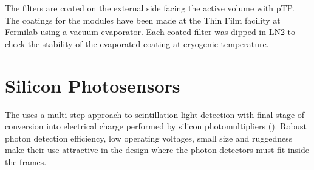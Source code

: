 The filters are coated on the external side facing the \lar active volume with pTP.  The coatings for the  modules have been made at the Thin Film facility at Fermilab using a vacuum evaporator. Each coated filter was dipped in LN2 to check the stability of the evaporated coating at cryogenic temperature. 




%




\section{Silicon Photosensors}
\label{sec:fdsp-pd-ps}

The   uses a multi-step approach to scintillation light detection with final stage of conversion into electrical charge performed by silicon photomultipliers (). Robust photon detection efficiency, low operating voltages, small size and ruggedness make their use attractive in the \single design where the photon detectors must  %
fit  inside the  frames. 

